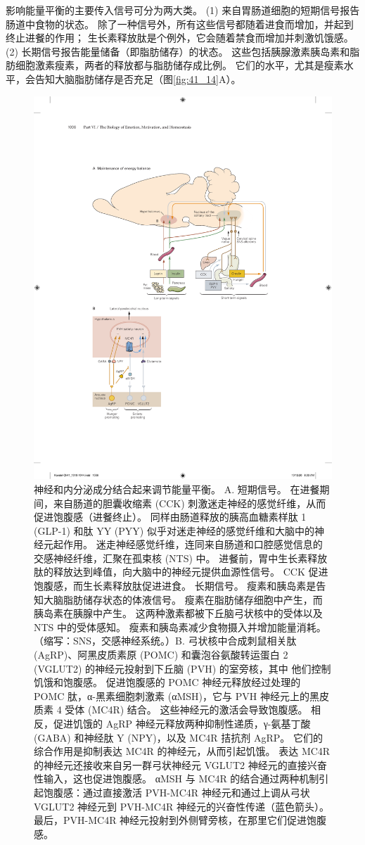影响能量平衡的主要传入信号可分为两大类。 (1) 来自胃肠道细胞的短期信号报告肠道中食物的状态。 除了一种信号外，所有这些信号都随着进食而增加，并起到终止进餐的作用； 生长素释放肽是个例外，它会随着禁食而增加并刺激饥饿感。 (2) 长期信号报告能量储备（即脂肪储存）的状态。 
这些包括胰腺激素胰岛素和脂肪细胞激素瘦素，两者的释放都与脂肪储存成比例。 
它们的水平，尤其是瘦素水平，会告知大脑脂肪储存是否充足（图\ref{fig:41_14}A）。

\begin{figure}[htbp]
	\centering
	\includegraphics[width=0.8\linewidth]{chap41/fig_41_14}
	\caption{神经和内分泌成分结合起来调节能量平衡。 A. 短期信号。 在进餐期间，来自肠道的胆囊收缩素 (CCK) 刺激迷走神经的感觉纤维，从而促进饱腹感（进餐终止）。 同样由肠道释放的胰高血糖素样肽 1 (GLP-1) 和肽 YY (PYY) 似乎对迷走神经的感觉纤维和大脑中的神经元起作用。 迷走神经感觉纤维，连同来自肠道和口腔感觉信息的交感神经纤维，汇聚在孤束核 (NTS) 中。 进餐前，胃中生长素释放肽的释放达到峰值，向大脑中的神经元提供血源性信号。 CCK 促进饱腹感，而生长素释放肽促进进食。 长期信号。 瘦素和胰岛素是告知大脑脂肪储存状态的体液信号。 瘦素在脂肪储存细胞中产生，而胰岛素在胰腺中产生。 这两种激素都被下丘脑弓状核中的受体以及 NTS 中的受体感知。 瘦素和胰岛素减少食物摄入并增加能量消耗。 （缩写：SNS，交感神经系统。）B. 弓状核中合成刺鼠相关肽 (AgRP)、阿黑皮质素原 (POMC) 和囊泡谷氨酸转运蛋白 2 (VGLUT2) 的神经元投射到下丘脑 (PVH) 的室旁核，其中 他们控制饥饿和饱腹感。 促进饱腹感的 POMC 神经元释放经过处理的 POMC 肽，α-黑素细胞刺激素 (αMSH)，它与 PVH 神经元上的黑皮质素 4 受体 (MC4R) 结合。 这些神经元的激活会导致饱腹感。 相反，促进饥饿的 AgRP 神经元释放两种抑制性递质，γ-氨基丁酸 (GABA) 和神经肽 Y (NPY)，以及 MC4R 拮抗剂 AgRP。 它们的综合作用是抑制表达 MC4R 的神经元，从而引起饥饿。 表达 MC4R 的神经元还接收来自另一群弓状神经元 VGLUT2 神经元的直接兴奋性输入，这也促进饱腹感。 αMSH 与 MC4R 的结合通过两种机制引起饱腹感：通过直接激活 PVH-MC4R 神经元和通过上调从弓状 VGLUT2 神经元到 PVH-MC4R 神经元的兴奋性传递（蓝色箭头）。 最后，PVH-MC4R 神经元投射到外侧臂旁核，在那里它们促进饱腹感。}

\end{figure}
